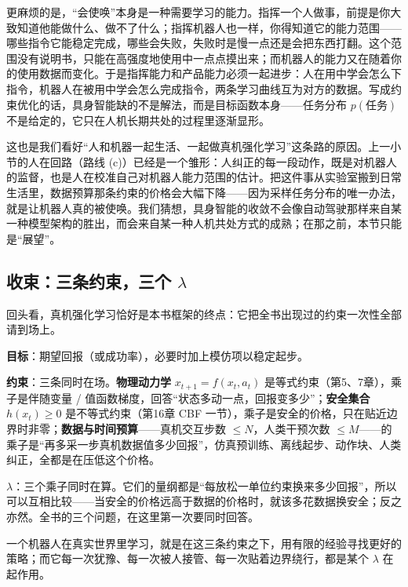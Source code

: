 更麻烦的是，“会使唤”本身是一种需要学习的能力。指挥一个人做事，前提是你大致知道他能做什么、做不了什么；指挥机器人也一样，你得知道它的能力范围——哪些指令它能稳定完成，哪些会失败，失败时是慢一点还是会把东西打翻。这个范围没有说明书，只能在高强度地使用中一点点摸出来；而机器人的能力又在随着你的使用数据而变化。于是指挥能力和产品能力必须一起进步：人在用中学会怎么下指令，机器人在被用中学会怎么完成指令，两条学习曲线互为对方的数据。写成约束优化的话，具身智能缺的不是解法，而是目标函数本身——任务分布 $p(\text{任务})$ 不是给定的，它只在人机长期共处的过程里逐渐显形。

这也是我们看好“人和机器一起生活、一起做真机强化学习”这条路的原因。上一小节的人在回路（路线 (c)）已经是一个雏形：人纠正的每一段动作，既是对机器人的监督，也是人在校准自己对机器人能力范围的估计。把这件事从实验室搬到日常生活里，数据预算那条约束的价格会大幅下降——因为采样任务分布的唯一办法，就是让机器人真的被使唤。我们猜想，具身智能的收敛不会像自动驾驶那样来自某一种模型架构的胜出，而会来自某一种人机共处方式的成熟；在那之前，本节只能是“展望”。

\subsection{收束：三条约束，三个 $\lambda$}

回头看，真机强化学习恰好是本书框架的终点：它把全书出现过的约束一次性全部请到场上。

\begin{keyidea}
\textbf{目标}：期望回报（或成功率），必要时加上模仿项以稳定起步。

\textbf{约束}：三条同时在场。\textbf{物理动力学} $x_{t+1} = f(x_t, a_t)$ 是等式约束（第5、7章），乘子是伴随变量 / 值函数梯度，回答“状态多动一点，回报变多少”；\textbf{安全集合} $h(x_t) \ge 0$ 是不等式约束（第16章 CBF 一节），乘子是安全的价格，只在贴近边界时非零；\textbf{数据与时间预算}——真机交互步数 $\le N$，人类干预次数 $\le M$——的乘子是“再多采一步真机数据值多少回报”，仿真预训练、离线起步、动作块、人类纠正，全都是在压低这个价格。

\textbf{$\lambda$}：三个乘子同时在算。它们的量纲都是“每放松一单位约束换来多少回报”，所以可以互相比较——当安全的价格远高于数据的价格时，就该多花数据换安全；反之亦然。全书的三个问题，在这里第一次要同时回答。
\end{keyidea}

一个机器人在真实世界里学习，就是在这三条约束之下，用有限的经验寻找更好的策略；而它每一次犹豫、每一次被人接管、每一次贴着边界绕行，都是某个 $\lambda$ 在起作用。

